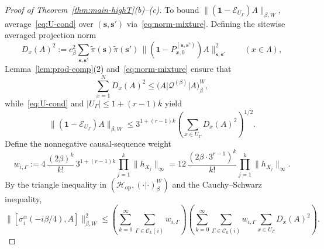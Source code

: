 \documentclass[11pt,a4paper]{article}
\numberwithin{equation}{section}
\theoremstyle{plain}
\theoremstyle{definition}
\newcommand{\Hop}{\mathcal{H}_{\mathrm{op}}}
\begin{document}
\begin{proof}[Proof of Theorem~\ref{thm:main-highT}(b)--(c)]
To bound $\|(\mathbf{1}-\mathcal{E}_{U_\Gamma})A\|_{\beta,W}$, average~\eqref{eq:U-cond} over $(\mathbf{s},\mathbf{s}')$ via~\eqref{eq:norm-mixture}. Defining the sitewise averaged projection norm
\[
  D_x(A)^2 := c_\beta^2 \sum_{\mathbf{s},\mathbf{s}'}\widetilde{\pi}(\mathbf{s})\widetilde{\pi}(\mathbf{s}')\,\bigl\|(\mathbf{1}-P_{x,0}^{(\mathbf{s},\mathbf{s}')})A\bigr\|_{\mathbf{s},\mathbf{s}'}^2 \qquad (x\in\Lambda),
\]
Lemma~\ref{lem:prod-comp}(2) and~\eqref{eq:norm-mixture} ensure that
\begin{equation}\label{eq:Dx-sum}
  \sum_{x=1}^N D_x(A)^2 \le \bigl(A\big|\mathcal{Q}^{(\beta)}\big|A\bigr)_\beta^W,
\end{equation}
while~\eqref{eq:U-cond} and $|U_\Gamma|\le 1+(r-1)k$ yield
\[
  \bigl\|(\mathbf{1}-\mathcal{E}_{U_\Gamma})A\bigr\|_{\beta,W}
  \le 3^{1+(r-1)k}\left(\sum_{x\in U_\Gamma} D_x(A)^2\right)^{1/2}.
\]
Define the nonnegative causal-sequence weight
\[
  w_{i,\Gamma} := 4\,\frac{(2\beta)^k}{k!}\,3^{1+(r-1)k}\prod_{j=1}^k \|h_{X_j}\|_\infty
  = 12\,\frac{(2\beta\cdot 3^{r-1})^k}{k!}\prod_{j=1}^k \|h_{X_j}\|_\infty.
\]
By the triangle inequality in $(\Hop,(\cdot|\cdot)_\beta^W)$ and the Cauchy--Schwarz inequality,
\begin{equation}\label{eq:I-CS}
  \bigl\|[\sigma_i^\alpha(-i\beta/4), A]\bigr\|_{\beta,W}^2
  \le \left(\sum_{k=0}^\infty\sum_{\Gamma\in\mathcal{C}_k(i)} w_{i,\Gamma}\right)
      \left(\sum_{k=0}^\infty\sum_{\Gamma\in\mathcal{C}_k(i)} w_{i,\Gamma}\sum_{x\in U_\Gamma} D_x(A)^2\right).
\end{equation}


\end{proof}
\end{document}
